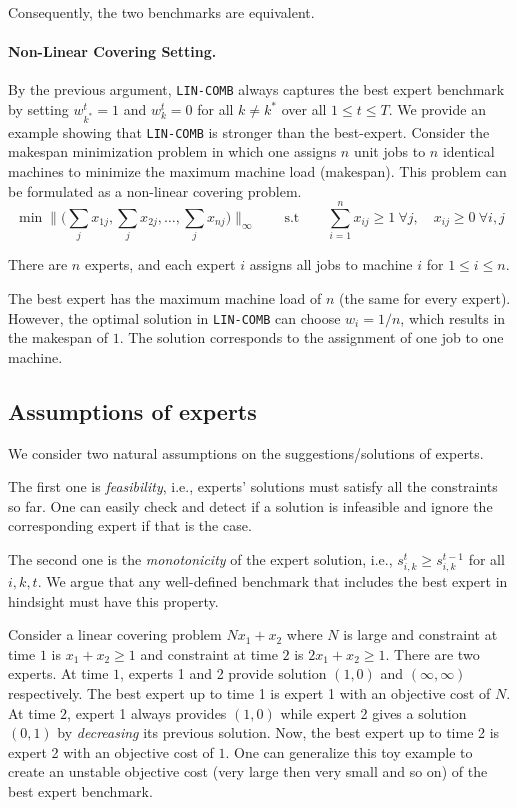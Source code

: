 Consequently, the two benchmarks are equivalent. 

\paragraph{Non-Linear Covering Setting.} By the previous argument, \texttt{LIN-COMB} always captures the best expert benchmark by setting 
$w_{k^{*}}^{t} = 1$ and $w_{k}^{t} = 0$ for all $k \neq k^{*}$ over all $1 \leq t \leq T$. We provide an example showing that \texttt{LIN-COMB} is stronger than 
the best-expert. Consider the makespan minimization problem in which one assigns $n$ unit jobs to $n$ identical machines to minimize the maximum machine load (makespan).   
This problem can be formulated as a non-linear covering problem.
$$
\min \biggl \| \biggl( \sum_{j} x_{1j}, \sum_{j} x_{2 j}, \ldots, \sum_{j} x_{n j} \biggr) \biggr \|_{\infty}
\qquad {\text{s.t}} \qquad
\sum_{i=1}^{n} x_{ij} \geq 1 ~\forall j, \quad x_{ij} \geq 0 ~\forall i,j
$$

There are $n$ experts, and each expert $i$ assigns all jobs to machine $i$ for $1 \leq i \leq n$. 

The best expert has the maximum machine load of $n$ (the same for every expert). However, the optimal solution in \texttt{LIN-COMB} can choose $w_{i} = 1/n$, which results in the makespan of $1$. The solution corresponds to the assignment of one job to one machine.  


\subsection{Assumptions of experts}		\label{sec:assumptions}
We consider two natural assumptions on the suggestions/solutions of experts. 

The first one is \emph{feasibility}, i.e., experts' solutions must satisfy all the constraints so far. One can easily check and detect if a solution is infeasible and ignore the corresponding expert if that is the case. 

The second one is the \emph{monotonicity} of the expert solution, i.e., $s_{i,k}^{t} \geq s_{i,k}^{t-1}$ for all $i,k,t$. We argue that any well-defined benchmark that includes the best expert in hindsight must have this property.

Consider a linear covering problem $Nx_{1} + x_{2}$ where $N$ is large and constraint at time $1$ is $x_{1} + x_{2} \geq 1$ and constraint at time $2$ is $2x_{1} + x_{2} \geq 1$. 
There are two experts. 
At time $1$, experts 1 and 2 provide solution $(1,0)$ and $(\infty, \infty)$ respectively. 
The best expert up to time 1 is expert 1 with an objective cost of $N$. 
At time $2$, expert 1 always provides $(1,0)$ while expert 2 gives a solution $(0,1)$ by \emph{decreasing} its previous solution.  
Now, the best expert up to time 2 is expert 2 with an objective cost of $1$. 
One can generalize this toy example to create an unstable objective cost (very large then very small and so on) of the best expert benchmark.

